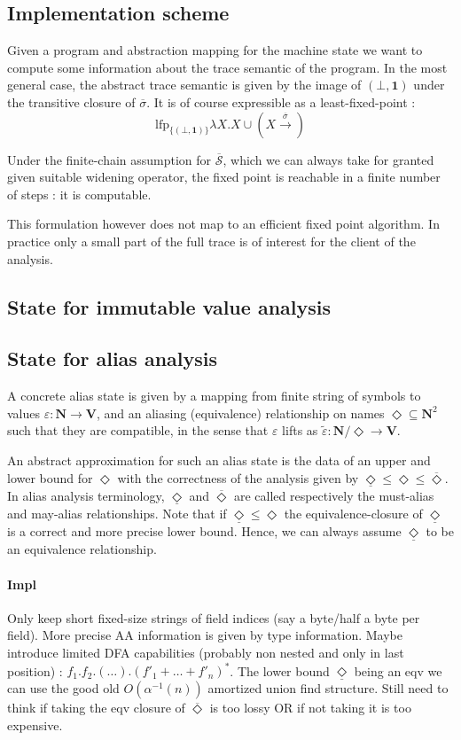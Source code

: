 \documentclass[14pt]{article}
\newcommand{\eps}{\varepsilon}
\newcommand{\D}{\Diamond}
\newcommand{\uD}{\underline{\Diamond}}
\newcommand{\UD}{\overline{\Diamond}}
\begin{document}
\subsection{Implementation scheme}

Given a program and abstraction mapping for the machine state we want to compute some information about the trace semantic of the program. In the most general case, the abstract trace semantic is given by the image of $(\bot,\mathbf{1})$ under the transitive closure of $\overline{\sigma}$. It is of course expressible as a least-fixed-point :
\[ \text{lfp}_{\{(\bot,\mathbf{1})\}}\lambda X. X\cup\left(X\xrightarrow{\overline{\sigma}}\right)\]

Under the finite-chain assumption for $\overline{\mathcal{S}}$, which we can always take for granted given suitable widening operator, the fixed point is reachable in a finite number of steps : it is computable.

This formulation however does not map to an efficient fixed point algorithm. In practice only a small part of the full trace is of interest for the client of the analysis.

\subsection{State for immutable value analysis}

\subsection{State for alias analysis}

A concrete alias state is given by a mapping from finite string of symbols to values $\eps:\mathbf{N}\to\mathbf{V}$, and an aliasing (equivalence) relationship on names $\D \subseteq \mathbf{N}^2$ such that they are compatible, in the sense that $\eps$ lifts as $\tilde{\eps} : \mathbf{N}/\D \to \mathbf{V}$.

An abstract approximation for such an alias state is the data of an upper and lower bound for $\D$ with the correctness of the analysis given by $\uD\leq\D\leq\UD$. In alias analysis terminology, $\uD$ and $\UD$ are called respectively the must-alias and may-alias relationships. Note that if $\uD\leq\D$ the equivalence-closure of $\uD$ is a correct and more precise lower bound. Hence, we can always assume $\uD$ to be an equivalence relationship.

\paragraph{Impl} Only keep short fixed-size strings of field indices (say a byte/half a byte per field). More precise AA information is given by type information. Maybe introduce limited DFA capabilities (probably non nested and only in last position) : $f_1.f_2.(\dots).(f'_1+\dots+f'_n)^*$. The lower bound $\uD$ being an eqv we can use the good old $O(\alpha^{-1}(n))$ amortized union find structure. Still need to think if taking the eqv closure of $\UD$ is too lossy OR if not taking it is too expensive.
\end{document}
